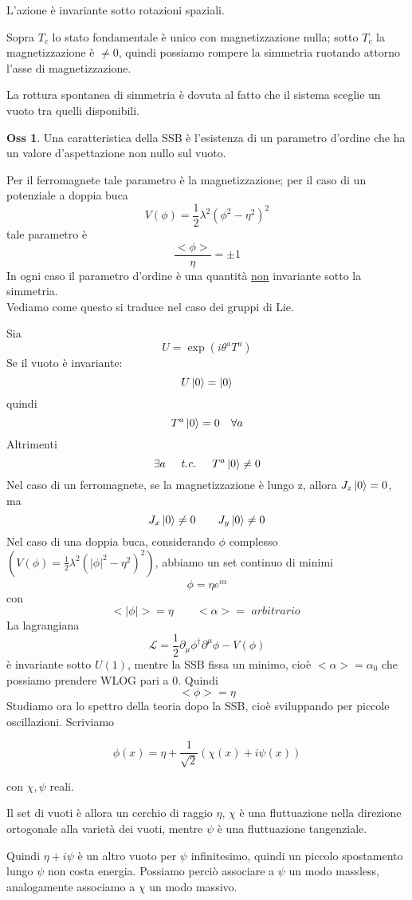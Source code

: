 \documentclass[10pt,a4paper]{article}
\theoremstyle{definition}
\newtheorem{observation}{Oss}[section]
\begin{document}
L'azione è invariante sotto rotazioni spaziali.

Sopra $T_c$ lo stato fondamentale è unico con magnetizzazione nulla; sotto $T_c$ la magnetizzazione è $\neq 0$, quindi possiamo rompere la simmetria ruotando attorno l'asse di magnetizzazione.

La rottura spontanea di simmetria è dovuta al fatto che il sistema sceglie un vuoto tra quelli disponibili.

\begin{observation}
Una caratteristica della SSB è l'esistenza di un parametro d'ordine che ha un valore d'aspettazione non nullo sul vuoto.
\end{observation}
Per il ferromagnete tale parametro è la magnetizzazione; per il caso di un potenziale a doppia buca
\[
V(\phi) = \frac{1}{2}\lambda^2(\phi^2 - \eta^2)^2    
\]
tale parametro è 
\[
\frac{<\phi>}{\eta} = \pm 1    
\]
In ogni caso il parametro d'ordine è una quantità \underline{non} invariante sotto la simmetria.
\\
Vediamo come questo si traduce nel caso dei gruppi di Lie.

Sia 
\[U = \exp(i\theta^a T^a)\]
Se il vuoto è invariante:
\[
    U\ket{0} = \ket{0} 
\]
quindi
\[T^a\ket{0} = 0 \quad \forall a\]
Altrimenti 
\[
\exists a \quad \textit{ t.c. } \quad T^a\ket{0} \neq 0    
\]
Nel caso di un ferromagnete, se la magnetizzazione è lungo z, allora $J_z\ket{0} = 0$, ma
\[
J_x \ket{0} \neq 0 \qquad J_y \ket{0} \neq 0    
\]
Nel caso di una doppia buca, considerando $\phi$ complesso \((V(\phi) = \frac{1}{2}\lambda^2 (|\phi|^2 - \eta^2)^2)\), abbiamo un set continuo di minimi
\[
\phi = \eta e^{i\alpha}    
\]
con 
\[
<|\phi|> = \eta \qquad <\alpha> = \textit{ arbitrario }  
\]
La lagrangiana 
\[
\mathcal{L} = \frac12\partial_\mu\phi^\dagger \partial^\mu\phi - V(\phi)   
\]
è invariante sotto $U(1)$, mentre la SSB fissa un minimo, cioè $<\alpha> = \alpha_0$ che possiamo prendere WLOG pari a 0. Quindi
\[
<\phi> = \eta    
\]
Studiamo ora lo spettro della teoria dopo la SSB, cioè sviluppando per piccole oscillazioni. Scriviamo

\[
\phi(x) = \eta + \frac{1}{\sqrt{2}}\left(\chi(x) + i\psi(x)\right)    
\]

con $\chi, \psi$ reali.

Il set di vuoti è allora un cerchio di raggio $\eta$, $\chi$ è una fluttuazione nella direzione ortogonale alla varietà dei vuoti, mentre $\psi$ è una fluttuazione tangenziale.

Quindi $\eta + i \psi$ è un altro vuoto per $\psi$ infinitesimo, quindi un piccolo spostamento lungo $\psi$ non costa energia. Possiamo perciò associare a $\psi$ un modo massless, analogamente associamo a $\chi$ un modo massivo.
\end{document}

